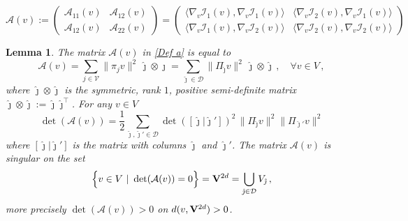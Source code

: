 \documentclass[10pt,a4paper]{amsart}
\newtheorem{lemma}{Lemma}
\newcommand{\cA}{{\mathcal A}}
\newcommand{\cD}{{\mathcal D}}
\newcommand{\cI}{{\mathcal I}}
\newcommand{\cV}{{\mathcal V}}
\newcommand{\twod}{{2d}}
\begin{document}
    \begin{equation}\label{Def a}
        \cA (v) :=
        \begin{pmatrix}
            \cA_{11} (v)  & \cA_{12} (v)   \\
             \cA_{12} (v)  &  \cA_{22} (v) 
        \end{pmatrix}  = 
        \begin{pmatrix}
            \langle \nabla_v \cI_1(v), \nabla_v \cI_1(v)\rangle  &
            \langle \nabla_v \cI_2(v), \nabla_v \cI_1(v)\rangle \\
            \langle \nabla_v \cI_1(v), \nabla_v \cI_2(v)\rangle  &
            \langle \nabla_v \cI_2(v), \nabla_v \cI_2(v)\rangle 
        \end{pmatrix}  
    \end{equation} 

    \begin{lemma} \label{Properties of a}
   The matrix  $ \cA(v)$ in \eqref{Def a} is  equal to   
        \begin{equation} \label{NablaI(v)NablaI(v) in coordinates}
            \cA(v)= \sum_{j\in \cV}
            \|\pi_{j} v\|^2\, \hat\jmath\otimes \hat\jmath = \sum_{{\hat \jmath}\in \cD}
            \|\Pi_{\hat \jmath} v\|^2
            \, \hat\jmath\otimes \hat\jmath \, ,
            \quad  \forall 
            v \in V \, , 
        \end{equation}
    where $ \hat\jmath\otimes \hat\jmath $ is the symmetric, rank $ 1 $, positive semi-definite  matrix  $\hat \jmath \otimes \hat \jmath:=\hat \jmath \hat \jmath^\top$.
    For any $v\in V$
    \begin{equation}\label{detAespli}
     \det(\cA(v))=\frac12\sum_{\hat \jmath,\hat \jmath' \in \cD} \det([\hat \jmath| \hat \jmath'])^2\, \|\Pi_{\hat \jmath} v\|^2\|\Pi_{\hat \jmath'} v\|^2
    \end{equation}
    where $[\hat\jmath| \hat \jmath']$ is the matrix with columns  $\hat \jmath$ and $\hat \jmath'$.
      The matrix $ \cA(v) $ is singular    on the set 
        \begin{equation}\label{Def S*}
            \Big\{ v \in V \ |\ \det( \cA ( v))  =0 \Big\} = {\bf V}^{\twod}  = 
            \bigcup_{{\hat \jmath} \in \cD} V_{\hat \jmath} \, ,    
        \end{equation}
      more precisely 
    $ \det (\cA (v)) > 0 $  on  
$ d(v,{\bf V}^{\twod}) > 0 $. 
        \end{lemma}
\end{document}
